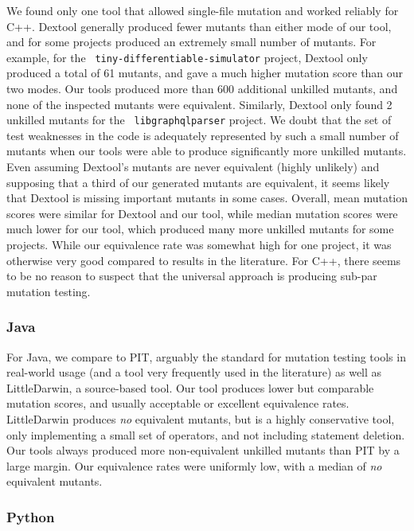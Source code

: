 \documentclass[sigconf,review, anonymous]{acmart}
\begin{document}
We found only one tool that allowed single-file mutation and worked
reliably for C++.  Dextool generally produced fewer mutants than
either mode of our tool, and for some projects produced an extremely
small number of mutants.  For example, for the {\tt
  tiny-differentiable-simulator} project, Dextool only produced a
total of 61 mutants, and gave a much higher mutation score than our
two modes.  Our tools produced more than 600 additional unkilled
mutants, and none of the inspected mutants were equivalent.
Similarly, Dextool only found 2 unkilled mutants for the {\tt
  libgraphqlparser} project.  We doubt that the set of test weaknesses
in the code is adequately represented by such a small number of
mutants when our tools were able to produce significantly more
unkilled mutants.  Even assuming Dextool's mutants are never
equivalent (highly unlikely) and supposing that a third of our
generated mutants are equivalent, it seems likely that Dextool is
missing important mutants in some cases.  Overall, mean mutation
scores were similar for Dextool and our tool, while
median mutation scores were much lower for our tool, which produced
many more unkilled mutants for some projects.  While our equivalence
rate was somewhat high for one project, it was otherwise very good
compared to results in the literature.  For C++, there seems to
be no reason to suspect that the universal approach is producing
sub-par mutation testing.

\subsubsection{Java}

For Java, we compare to PIT, arguably the standard for mutation
testing tools in real-world usage (and a tool very frequently used in
the literature) as well as LittleDarwin, a source-based tool.  Our
tool produces lower but comparable mutation scores, and usually
acceptable or excellent equivalence rates.  LittleDarwin produces
\emph{no} equivalent mutants, but is a highly conservative tool, only
implementing a small set of operators, and not including statement
deletion.  Our tools always produced more non-equivalent unkilled
mutants than PIT by a large margin.  Our equivalence rates were
uniformly low, with a median of \emph{no} equivalent mutants.

\subsubsection{Python}
\end{document}
